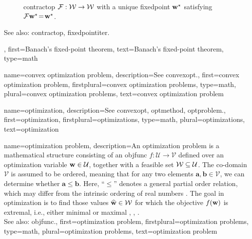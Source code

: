 {{\begin{figure}[H]
   	 	\caption{\Gls{contractop} $\mathcal{F}:\mathcal{W}\to\mathcal{W}$  
	  		with a unique \gls{fixedpoint} ${\bf w}^\star$ satisfying 
			$\mathcal{F} {\bf w}^\star\!=\!{\bf w}^\star$.}
    			\label{fig:banach_dict}
    		\end{figure}
    		See also: \gls{contractop}, \gls{fixedpointiter}.},
    	first={Banach's fixed-point theorem},
	text={Banach's fixed-point theorem},
    	type=math
}

{name={convex optimization problem}, 
	description={See \gls{convexopt}.},
	first={convex optimization problem},
	firstplural={convex optimization problems}, 
	type=math,
	plural={convex optimization problems}, 
	text={convex optimization problem}
}

{name={optimization}, 
	description={See \gls{convexopt}, \gls{optmethod}, \gls{optproblem}.},
	first={optimization},
	firstplural={optimizations}, 
	type=math,
	plural={optimizations}, 
	text={optimization}
}

{name={optimization problem}, 
	description={An \gls{optimization} problem is a mathematical 
		   structure consisting of an \gls{objfunc} $f: \mathcal{U} \rightarrow \mathcal{V}$ 
		   defined over an \gls{optimization} variable ${\bf w} \in \mathcal{U}$, together with a 
		   feasible set $\mathcal{W} \subseteq \mathcal{U}$. The \gls{co-domain} $\mathcal{V}$ is 
		   assumed to be ordered, meaning that for any two elements $\mathbf{a}, \mathbf{b} \in \mathcal{V}$, 
		   we can determine whether $\mathbf{a} \leq \mathbf{b}$.
		   Here, ``$\leq$'' denotes a general partial order relation, which may differ 
		   from the intrinsic ordering of real numbers \cite[Sec. 2.4]{BoydConvexBook}. 
		   The goal in \gls{optimization} is to find those values $\widehat{{\bf w}} \in \mathcal{W}$ 
		   for which the objective $f({\bf w})$ is extremal, i.e., either minimal or maximal 
		   \cite{BoydConvexBook}, \cite{nesterov04}, \cite{BertsekasNonLinProgr}.
		   \\
		   See also: \gls{objfunc}.},
	first={optimization problem},
	firstplural={optimization problems}, 
	type=math,
	plural={optimization problems}, 
	text={optimization problem}
}

